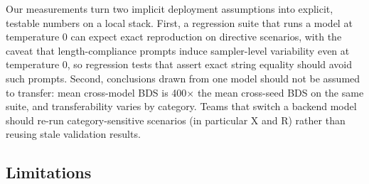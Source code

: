 \documentclass[11pt]{article}
\begin{document}
Our measurements turn two implicit deployment assumptions into explicit,
testable numbers on a local stack. First, a regression suite that runs a
model at temperature 0 can expect exact reproduction on directive
scenarios, with the caveat that length-compliance prompts induce
sampler-level variability even at temperature 0, so regression tests that
assert exact string equality should avoid such prompts. Second, conclusions
drawn from one model should not be assumed to transfer: mean cross-model
BDS is 400$\times$ the mean cross-seed BDS on the same suite, and
transferability varies by category. Teams that switch a backend model
should re-run category-sensitive scenarios (in particular \textsc{X} and
\textsc{R}) rather than reusing stale validation results.

\subsection{Limitations}
\end{document}
